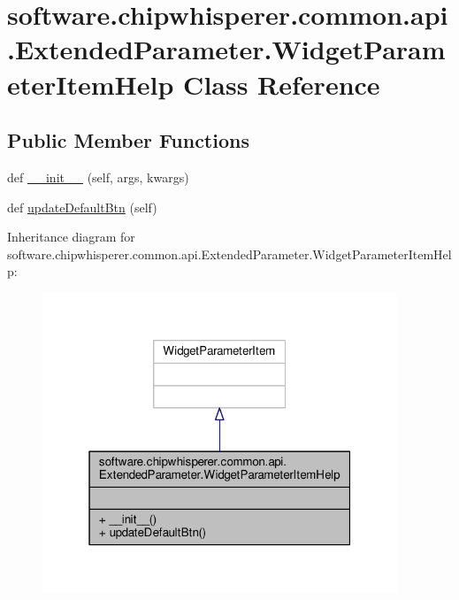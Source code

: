\hypertarget{classsoftware_1_1chipwhisperer_1_1common_1_1api_1_1ExtendedParameter_1_1WidgetParameterItemHelp}{}\section{software.\+chipwhisperer.\+common.\+api.\+Extended\+Parameter.\+Widget\+Parameter\+Item\+Help Class Reference}
\label{classsoftware_1_1chipwhisperer_1_1common_1_1api_1_1ExtendedParameter_1_1WidgetParameterItemHelp}
\subsection*{Public Member Functions}
\begin{DoxyCompactItemize}
\item 
def \hyperlink{classsoftware_1_1chipwhisperer_1_1common_1_1api_1_1ExtendedParameter_1_1WidgetParameterItemHelp_a8a1dfecc8b03467ec1f64b9373b9f286}{\+\_\+\+\_\+init\+\_\+\+\_\+} (self, args, kwargs)
\item 
def \hyperlink{classsoftware_1_1chipwhisperer_1_1common_1_1api_1_1ExtendedParameter_1_1WidgetParameterItemHelp_a039994d4287d1ae2a6f3b6e6ec1b2fae}{update\+Default\+Btn} (self)
\end{DoxyCompactItemize}


Inheritance diagram for software.\+chipwhisperer.\+common.\+api.\+Extended\+Parameter.\+Widget\+Parameter\+Item\+Help\+:\nopagebreak
\begin{figure}[H]
\begin{center}
\leavevmode
\includegraphics[width=301pt]{d3/d0a/classsoftware_1_1chipwhisperer_1_1common_1_1api_1_1ExtendedParameter_1_1WidgetParameterItemHelp__inherit__graph}
\end{center}
\end{figure}


